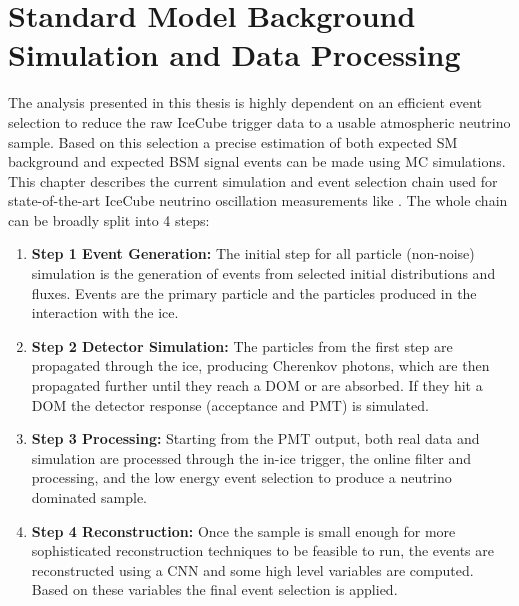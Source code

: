 \setchapterpreamble[u]{\margintoc}



\chapter{Standard Model Background Simulation and Data Processing}

The analysis presented in this thesis is highly dependent on an efficient event selection to reduce the raw IceCube trigger data to a usable atmospheric neutrino sample. Based on this selection a precise estimation of both expected SM background and expected BSM signal events can be made using MC simulations. This chapter describes the current simulation and event selection chain used for state-of-the-art IceCube neutrino oscillation measurements like . The whole chain can be broadly split into 4 steps:

\begin{enumerate}[wide]
    
    \item[]{\textbf{Step 1 Event Generation:}} The initial step for all particle (non-noise) simulation is the generation of events from selected initial distributions and fluxes. Events are the primary particle and the particles produced in the interaction with the ice.
    \vspace{0.2cm} 

    \item[]{\textbf{Step 2 Detector Simulation:}} The particles from the first step are propagated through the ice, producing Cherenkov photons, which are then propagated further until they reach a DOM or are absorbed. If they hit a DOM the detector response (acceptance and PMT) is simulated.
    \vspace{0.2cm} 
        
    \item[]{\textbf{Step 3 Processing:}} Starting from the PMT output, both real data and simulation are processed through the in-ice trigger, the online filter and processing, and the low energy event selection to produce a neutrino dominated sample.
    \vspace{0.2cm} 

    \item[]{\textbf{Step 4 Reconstruction:}} Once the sample is small enough for more sophisticated reconstruction techniques to be feasible to run, the events are reconstructed using a CNN and some high level variables are computed. Based on these variables the final event selection is applied.
    
\end{enumerate}

